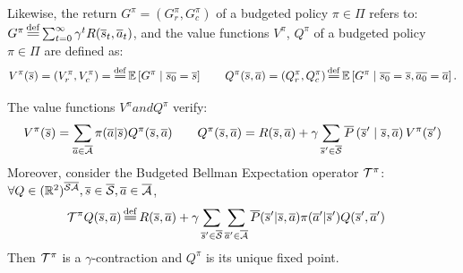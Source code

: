 \documentclass{article}
\begin{document}
Likewise, the return $G^\pi = (G_r^\pi, G_c^\pi)$ of a budgeted policy $\pi\in\Pi$ refers to:
$G^\pi \eqdef \sum_{t=0}^\infty \gamma^t R(\os_t, \oa_t)$,
and the value functions $V^\pi$, $Q^\pi$ of a budgeted policy $\pi\in\Pi$ are defined as:
\begin{equation}
    \label{eq:value-function}
V^\pi(\os) = (V_r^\pi, V_c^\pi) = \eqdef \expectedvalue\left[ G^\pi \condbar \ov{s_0} = \os\right] \qquad Q^\pi(\os, \oa)= (Q_r^\pi, Q_c^\pi) \eqdef \expectedvalue\left[ G^\pi \condbar \ov{s_0} = \os, \ov{a_0} = \oa\right].
\end{equation}

\begin{proposition}
\label{prop:bellman-expectation}
The value functions $V^\pi and Q^\pi$ verify:
\begin{align}
    V^\pi(\overline{s}) = \sum_{\overline{a}\in\overline{\mathcal{A}}}\pi(\overline{a} | \overline{s}) Q^\pi(\overline{s}, \overline{a}) \qquad Q^\pi(\overline{s}, \overline{a}) = R(\overline{s}, \overline{a}) + \gamma\sum_{\overline{s}'\in\overline{\mathcal{S}}}\overline{P}\left(\overline{s}' \;\middle|\; \overline{s}, \overline{a}\right) V^\pi(\overline{s}') \label{eq:bellman_expectation}
\end{align}
Moreover, consider the Budgeted Bellman Expectation operator $\mathcal{T}^\pi$:
$\forall Q\in(\mathbb{R}^2)^{\overline{\mathcal{S}}\overline{\mathcal{A}}}, \overline{s}\in\overline{\mathcal{S}}, \overline{a}\in\overline{\mathcal{A}}$,
\begin{align}
\label{eq:bellman_expectation_operator}
    \cT^\pi Q(\os, \oa) &\eqdef R(\os, \oa) + \gamma \sum_{\os'\in\ocS}\sum_{\oa'\in\ocA}\ov{P}(\os'|\os, \oa)\pi(\oa'|\os') Q(\os', \oa')
\end{align}
Then $\mathcal{T}^\pi$ is a $\gamma$-contraction and $Q^\pi$ is its unique fixed point.
\end{proposition}
\end{document}
